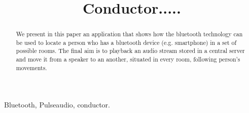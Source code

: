 \documentclass[conference]{./IEEEtran}
\begin{document}
\title{Conductor.....}

\author{
\and
{}
}

\maketitle


\begin{abstract}
We present in this paper an application that shows how the bluetooth technology can be used to locate a person who has a bluetooth device (e.g. smartphone) in a set of possible rooms.  The final aim is to playback an audio stream stored in a central server and move it from a speaker to an another, situated in every room, following person's movements.
\end{abstract}

\begin{IEEEkeywords}%
Bluetooth, Pulseaudio, conductor.
\end{IEEEkeywords}




%
\IEEEpeerreviewmaketitle


\end{document}
